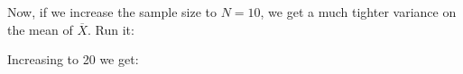 \begin{fullwidth}

\step Now, if we increase the sample size to $N=10$, we get a much tighter variance on the mean of $\overline{X}$. Run it:


\step Increasing to 20 we get:


\end{fullwidth}
